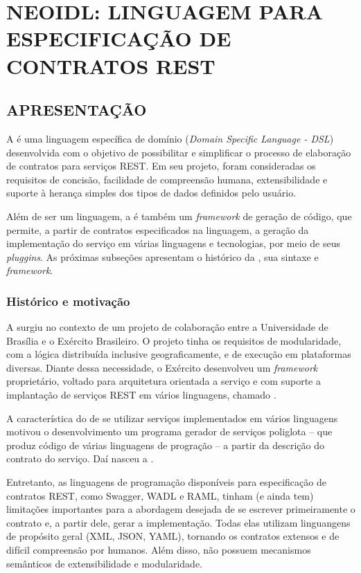 \chapter{NEOIDL: LINGUAGEM PARA ESPECIFICAÇÃO DE CONTRATOS REST	}
\vspace{-6mm}


\section{APRESENTAÇÃO}

A \neoidl{} é uma linguagem específica de domínio (\textit{Domain Specific
Language - DSL}) desenvolvida com o objetivo de possibilitar e simplificar o
processo de elaboração de contratos para serviços REST. Em seu projeto, foram
consideradas os requisitos de concisão, facilidade de compreensão humana,
extensibilidade e suporte à herança simples dos tipos de dados definidos pelo
usuário.

Além de ser um linguagem, a \neoidl{} é também um \textit{framework} de geração
de código, que permite, a partir de contratos especificados na linguagem, a geração
da implementação do serviço em várias linguagens e tecnologias, por meio de seus
\textit{pluggins}. As próximas subseções apresentam o histórico da \neoidl{},
sua sintaxe e \textit{framework}.


\subsection{Histórico e motivação}
\vspace{-6mm}

A \neoidl{} surgiu no contexto de um projeto de colaboração entre a Universidade
de Brasília e o Exército Brasileiro. O projeto tinha os requisitos de modularidade,
com a lógica distribuída inclusive geograficamente, e de execução em plataformas
diversas. Diante dessa necessidade, o Exército desenvolveu um \textit{framework}
proprietário, voltado para arquitetura orientada a serviço e com suporte
a implantação de serviços REST em vários linguagens, chamado \neocortex{}.

A característica do \neocortex{} de se utilizar serviços implementados em vários
linguagens motivou o desenvolvimento um programa gerador de serviços poliglota
-- que produz código de várias linguagens de progração -- a partir da descrição
do contrato do serviço. Daí nasceu a \neoidl{}.

Entretanto, as linguagens de programação disponíveis para especificação de
contratos REST, como Swagger, WADL e RAML, tinham (e ainda tem) limitações
importantes para a abordagem desejada de se escrever primeiramente o contrato e,
a partir dele, gerar a implementação. Todas elas utilizam linguangens de
propósito geral (XML, JSON, YAML), tornando os contratos extensos e de difícil
compreensão por humanos. Além disso, não possuem mecanismos semânticos de
extensibilidade e modularidade.

